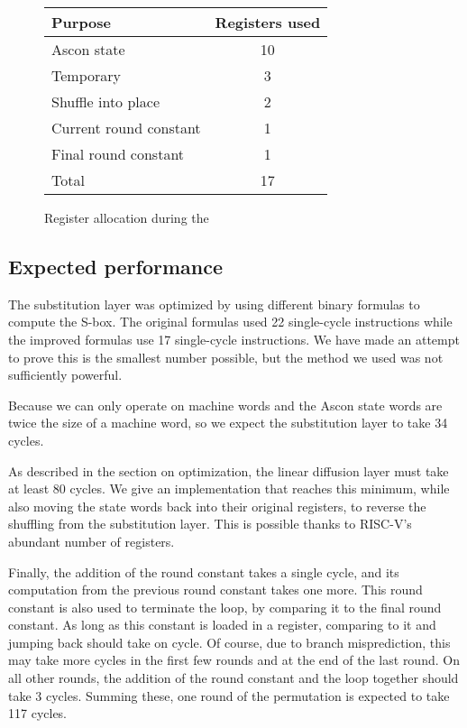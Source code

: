 \begin{figure}
\begin{center}
\begin{tabular}{l c}
Purpose & Registers used \\ \hline
Ascon state & 10 \\
Temporary & 3 \\
Shuffle into place & 2 \\
Current round constant & 1 \\
Final round constant & 1 \\ \hline
Total & 17
\end{tabular}
\end{center}
\caption{Register allocation during the }
\label{registers}
\end{figure}

\subsection{Expected performance}

The substitution layer was optimized by using different binary formulas to
compute the S-box. The original formulas used 22 single-cycle instructions while
the improved formulas use 17 single-cycle instructions. We have made an attempt
to prove this is the smallest number possible, but the method we used was not
sufficiently powerful.

Because we can only operate on machine words and the Ascon state words are twice
the size of a machine word, so we expect the substitution layer to take 34
cycles.

As described in the section on optimization, the linear diffusion layer must
take at least 80 cycles. We give an implementation that reaches this minimum,
while also moving the state words back into their original registers, to reverse
the shuffling from the substitution layer. This is possible thanks to RISC-V's
abundant number of registers.

Finally, the addition of the round constant takes a single cycle, and its
computation from the previous round constant takes one more. This round constant
is also used to terminate the loop, by comparing it to the final round constant.
As long as this constant is loaded in a register, comparing to it and jumping
back should take on cycle. Of course, due to branch misprediction, this may take
more cycles in the first few rounds and at the end of the last round. On all
other rounds, the addition of the round constant and the loop together should
take 3 cycles. Summing these, one round of the permutation is expected to take
117 cycles.


